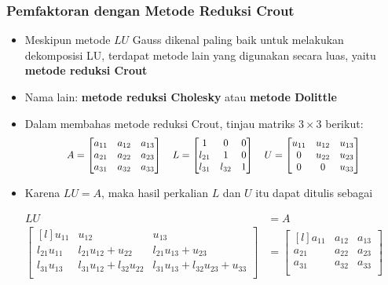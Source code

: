 \documentclass[pdflatex,compress,mathserif]{beamer}
\newcommand*{\Scale}[2][4]{\scalebox{#1}{$#2$}}%
\begin{document}
\begin{frame}
	\frametitle{Pemfaktoran dengan Metode Reduksi Crout}
	\begin{itemize}
		\item Meskipun metode $ LU $ Gauss dikenal paling baik untuk melakukan dekomposisi LU, terdapat metode lain yang digunakan secara luas, yaitu \textbf{metode reduksi Crout}
		\item Nama lain: \textbf{metode reduksi Cholesky} atau \textbf{metode Dolittle}
		\item Dalam membahas metode reduksi Crout, tinjau matriks $ 3 \times 3 $ berikut:
		\[\Scale[0.9]{
		A = \begin{bmatrix}
			a_{11} & a_{12} & a_{13} \\
			a_{21} & a_{22} & a_{23} \\
			a_{31} & a_{32} & a_{33} \\
		\end{bmatrix}\quad
		L = \begin{bmatrix}
			1 & 0 & 0 \\
			l_{21} & 1 & 0 \\
			l_{31} & l_{32} & 1 \\
		\end{bmatrix}\quad
		U = \begin{bmatrix}
			u_{11} & u_{12} & u_{13} \\
			0 & u_{22} & u_{23} \\
			0 & 0 & u_{33} \\
		\end{bmatrix}
		}\]
	\end{itemize}
\end{frame}

\begin{frame}
	\begin{itemize}
		\item Karena $ LU = A $, maka hasil perkalian $ L $ dan $ U $ itu dapat ditulis sebagai
	\end{itemize}
	\begin{align*}
		LU &= A \\
		\begin{bmatrix*}[l]
		u_{11} & u_{12} & u_{13} \\
		l_{21}u_{11} & l_{21}u_{12}+u_{22} & l_{21}u_{13}+u_{23} \\
		l_{31}u_{13} & l_{31}u_{12} + l_{32}u_{22}  & l_{31}u_{13} + l_{32}u_{23} + u_{33}\\
		\end{bmatrix*} &= \begin{bmatrix*}[l]
		a_{11} & a_{12} & a_{13} \\
		a_{21} & a_{22} & a_{23} \\
		a_{31} & a_{32} & a_{33} \\
		\end{bmatrix*}
	\end{align*}
\end{frame}
\end{document}
